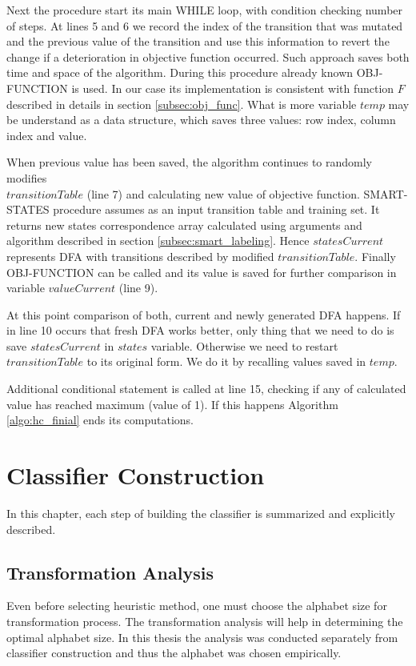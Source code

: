 \documentclass{mini}
\begin{document}
Next the procedure start its main \textsc{WHILE} loop, with condition checking number of steps. At lines 5 and 6 we record the index of the transition that was mutated and the previous value of the transition and use this information to revert the change if a deterioration in objective function occurred. Such approach saves both time and space of the algorithm. During this procedure already known \textsc{OBJ-FUNCTION} is used. In our case its implementation is consistent with function $F$ described in details in section \ref{subsec:obj_func}. What is more variable $temp$ may be understand as a data structure, which saves three values: row index, column index and value.

When previous value has been saved, the algorithm continues to randomly modifies \\ $transitionTable$ (line 7) and calculating new value of objective function. \textsc{SMART-STATES} procedure assumes as an input transition table and training set. It returns new states correspondence array calculated using arguments and algorithm described in section \ref{subsec:smart_labeling}. Hence $statesCurrent$ represents DFA with transitions described by modified $transitionTable$. Finally \textsc{OBJ-FUNCTION} can be called and its value is saved for further comparison in variable $valueCurrent$ (line 9).

At this point comparison of both, current and newly generated DFA happens. If in line 10 occurs that fresh DFA works better, only thing that we need to do is save $statesCurrent$ in $states$ variable. Otherwise we need to restart $transitionTable$ to its original form. We do it by recalling values saved in $temp$.

Additional conditional statement is called at line 15, checking if any of calculated value has reached maximum (value of 1). If this happens Algorithm \ref{algo:hc_finial} ends its computations.

\chapter{Classifier Construction}\label{chap:classifier}

In this chapter, each step of building the classifier is summarized and explicitly described.

\section{Transformation Analysis}
Even before selecting heuristic method, one must choose the alphabet size for transformation process. The transformation analysis will help in determining the optimal alphabet size. In this thesis the analysis was conducted separately from classifier construction and thus the alphabet was chosen empirically.
\end{document}
